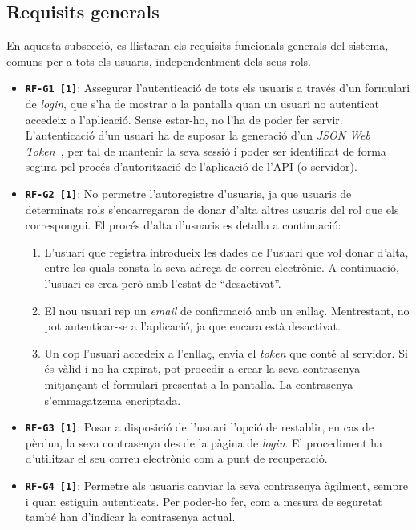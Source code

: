 \documentclass[a4paper,12pt]{ThesisStyle}
\begin{document}
\subsection{Requisits generals}
\label{subsec:requisits_generals}

En aquesta subsecció, es llistaran els requisits funcionals generals del sistema, comuns per a tots els usuaris, independentment dels seus rols.

\begin{itemize}
  \item \texttt{\textbf{RF-G1 [1]}}: Assegurar l'autenticació de tots els usuaris a través d'un formulari de \textit{login}, que s'ha de mostrar a la pantalla quan un usuari no autenticat accedeix a l'aplicació. Sense estar-ho, no l'ha de poder fer servir. L'autenticació d'un usuari ha de suposar la generació d'un \textit{JSON Web Token}~\cite{JWT}, per tal de mantenir la seva sessió i poder ser identificat de forma segura pel procés d'autorització de l'aplicació de l'API (o servidor).
  \item \texttt{\textbf{RF-G2 [1]}}: No permetre l'autoregistre d'usuaris, ja que usuaris de determinats rols s'encarregaran de donar d'alta altres usuaris del rol que els correspongui. El procés d'alta d'usuaris es detalla a continuació:
        \begin{enumerate}
          \item L'usuari que registra introdueix les dades de l'usuari que vol donar d'alta, entre les quals consta la seva adreça de correu electrònic. A continuació, l'usuari es crea però amb l'estat de ``desactivat''.
          \item El nou usuari rep un \textit{email} de confirmació amb un enllaç. Mentrestant, no pot autenticar-se a l'aplicació, ja que encara està desactivat.
          \item Un cop l'usuari accedeix a l'enllaç, envia el \textit{token} que conté al servidor. Si és vàlid i no ha expirat, pot procedir a crear la seva contrasenya mitjançant el formulari presentat a la pantalla. La contrasenya s'emmagatzema encriptada.
        \end{enumerate}
  \item \texttt{\textbf{RF-G3 [1]}}: Posar a disposició de l'usuari l'opció de restablir, en cas de pèrdua, la seva contrasenya des de la pàgina de \textit{login}. El procediment ha d'utilitzar el seu correu electrònic com a punt de recuperació.
  \item \texttt{\textbf{RF-G4 [1]}}: Permetre als usuaris canviar la seva contrasenya àgilment, sempre i quan estiguin autenticats. Per poder-ho fer, com a mesura de seguretat també han d'indicar la contrasenya actual.

\end{itemize}
\end{document}
